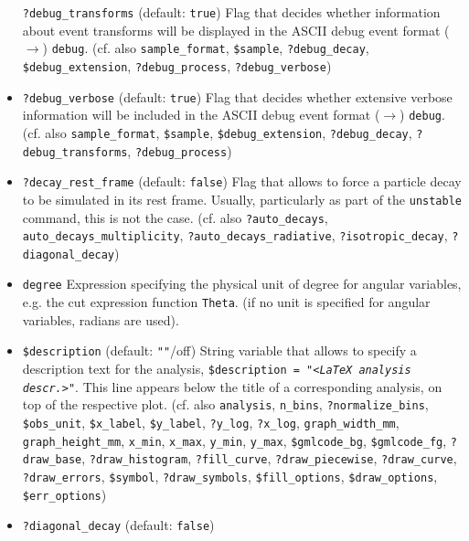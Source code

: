 \documentclass[12pt]{book}
\newcommand{\ttt}[1]{\texttt{#1}}
\begin{document}
\begin{itemize}
\ttt{?debug\_transforms} \qquad (default: \ttt{true}) \newline
Flag that decides whether information about event transforms will be
displayed in the ASCII debug event format ($\to$)
\ttt{debug}. (cf. also \ttt{sample\_format}, 
\ttt{\$sample}, \ttt{?debug\_decay}, \ttt{\$debug\_extension}, 
\ttt{?debug\_process}, \ttt{?debug\_verbose})  
\item
\ttt{?debug\_verbose} \qquad (default: \ttt{true}) \newline
Flag that decides whether extensive verbose information will be
included in the ASCII debug event format ($\to$)
\ttt{debug}. (cf. also \ttt{sample\_format}, 
\ttt{\$sample}, \ttt{\$debug\_extension}, \ttt{?debug\_decay},
\ttt{?debug\_transforms}, \ttt{?debug\_process})  
\item
\ttt{?decay\_rest\_frame} \qquad (default: \ttt{false}) \newline
Flag that allows to force a particle decay to be simulated in its rest
frame. Usually, particularly as part of the \ttt{unstable} command,
this is not the case. (cf. also \ttt{?auto\_decays},
\ttt{auto\_decays\_multiplicity}, \ttt{?auto\_decays\_radiative},
\ttt{?isotropic\_decay}, \newline \ttt{?diagonal\_decay})
\item
\ttt{degree} \newline
Expression specifying the physical unit of degree for angular
variables, e.g. the cut expression function \ttt{Theta}. (if no unit is
specified for angular variables, radians are used). 
\item
\ttt{\$description} \qquad (default: \ttt{""}/off) \newline
String variable that allows to specify a description text for the
analysis, \ttt{\$description = "{\em <LaTeX analysis descr.>}"}.  
This line appears below the title of a corresponding analysis, on top
of the respective plot. 
 (cf. also \ttt{analysis}, 
\ttt{n\_bins}, \ttt{?normalize\_bins}, \ttt{\$obs\_unit}, \ttt{\$x\_label},
\ttt{\$y\_label}, \ttt{?y\_log}, \ttt{?x\_log},
\ttt{graph\_width\_mm}, \ttt{graph\_height\_mm}, 
\ttt{x\_min}, \ttt{x\_max}, \ttt{y\_min}, \ttt{y\_max},
\ttt{\$gmlcode\_bg}, \ttt{\$gmlcode\_fg}, \ttt{?draw\_base},
\ttt{?draw\_histogram}, \ttt{?fill\_curve}, \ttt{?draw\_piecewise}, 
\ttt{?draw\_curve}, \ttt{?draw\_errors}, \ttt{\$symbol}, 
\ttt{?draw\_symbols}, \ttt{\$fill\_options}, \ttt{\$draw\_options},
\ttt{\$err\_options})
\item
\ttt{?diagonal\_decay} \qquad (default: \ttt{false}) \newline

\end{itemize}
\end{document}
